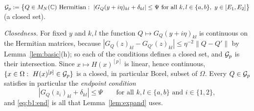 \begin{definition}[good set for the pair $p=(a,b)$]\label{def:goodB}
$\cG_p:=\big\{Q\in M_N(\C)\text{ Hermitian}:\ |G_Q(y+i\eta)_{kl}+\delta_{kl}|\le\Psi\ \text{for all }k,l\in\{a,b\},\ y\in[E_1,E_2]\big\}$ (a closed set).
\end{definition}
\noindent\emph{Closedness.} For fixed $y$ and $k,l$ the function $Q\mapsto G_Q(y+i\eta)_{kl}$ is continuous on the Hermitian matrices, because
$|G_Q(z)_{kl}-G_{Q'}(z)_{kl}|\le\eta^{-2}\|Q-Q'\|$ by Lemma~\ref{lem:basic}(h); so each of the conditions defines a closed set, and $\mathcal{G}_p$ is their
intersection. Since $x\mapsto H(x)^{[p]}$ is linear, hence continuous, $\{x\in\Omega:\ H(x)^{[p]}\in\cG_p\}$ is a closed, in particular Borel, subset of $\Omega$.
Every $Q\in\mathcal{G}_p$ satisfies in particular the \emph{endpoint condition}
\begin{equation}\label{eq:b1:end}
|G_Q(z_i)_{kl}+\delta_{kl}|\le\Psi\qquad\text{for all }k,l\in\{a,b\}\text{ and }i\in\{1,2\},
\end{equation}
and \eqref{eq:b1:end} is all that Lemma~\ref{lem:expand} uses.

